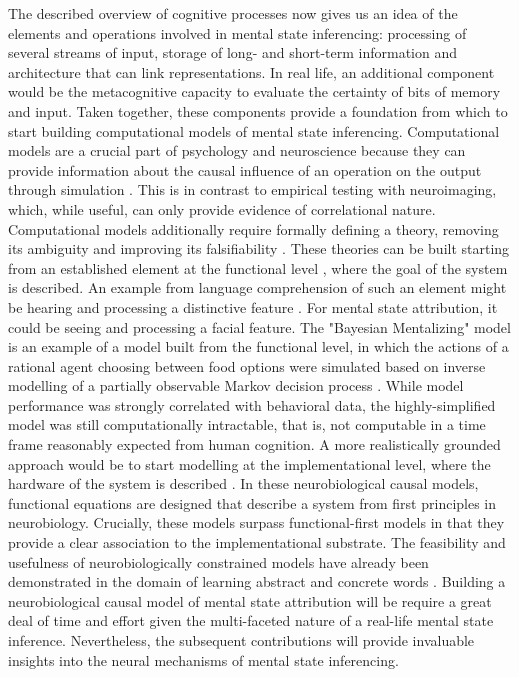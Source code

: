 The described overview of cognitive processes now gives us an idea of the elements and operations involved in mental state inferencing: processing of several streams of input, storage of long- and short-term information and architecture that can link representations. In real life, an additional component would be the metacognitive capacity to evaluate the certainty of bits of memory and input. Taken together, these components provide a foundation from which to start building computational models of mental state inferencing. Computational models are a crucial part of psychology and neuroscience because they can provide information about the causal influence of an operation on the output through simulation \citep{guest2020}. This is in contrast to empirical testing with neuroimaging, which, while useful, can only provide evidence of correlational nature. Computational models additionally require formally defining a theory, removing its ambiguity and improving its falsifiability \citep{guest2021}. These theories can be built starting from an established element at the functional level \citep[or computational level;][]{marr1982}, where the goal of the system is described. An example from language comprehension of such an element might be hearing and processing a distinctive feature \citep[the most basic unit in phonology;][]{poeppel2005}. For mental state attribution, it could be seeing and processing a facial feature. The "Bayesian Mentalizing" model is an example of a model built from the functional level, in which the actions of a rational agent choosing between food options were simulated based on inverse modelling of a partially observable Markov decision process \citep{baker2017}. While model performance was strongly correlated with behavioral data, the highly-simplified model was still computationally intractable, that is, not computable in a time frame reasonably expected from human cognition. A more realistically grounded approach would be to start modelling at the implementational level, where the hardware of the system is described \citep{fitz2024}. In these neurobiological causal models, functional equations are designed that describe a system from first principles in neurobiology. Crucially, these models surpass functional-first models in that they provide a clear association to the implementational substrate. The feasibility and usefulness of neurobiologically constrained models have already been demonstrated in the domain of learning abstract and concrete words \citep{dobler2024}. Building a neurobiological causal model of mental state attribution will be require a great deal of time and effort given the multi-faceted nature of a real-life mental state inference. Nevertheless, the subsequent contributions will provide invaluable insights into the neural mechanisms of mental state inferencing.  

